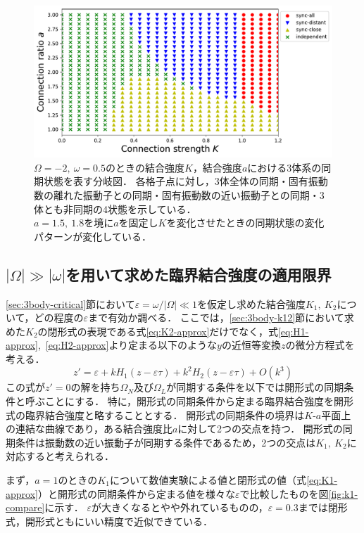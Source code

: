 \documentclass[../main]{subfiles}
\begin{document}
\begin{figure}[tbp]
\centering
\includegraphics[width=135mm]{./images/three-body-phase-boundary.pdf}
\centering
\caption{$\Omega=-2,\ \omega=0.5$のときの結合強度$K$，結合強度$a$における3体系の同期状態を表す分岐図．
各格子点に対し，3体全体の同期・固有振動数の離れた振動子との同期・固有振動数の近い振動子との同期・3体とも非同期の4状態を示している．\\
$a=1.5,\ 1.8$を境に$a$を固定し$K$を変化させたときの同期状態の変化パターンが変化している．}
\label{fig:3body-phase-boundary}
\end{figure}

\subsection{$|\Omega|\gg|\omega|$を用いて求めた臨界結合強度の適用限界}
\ref{sec:3body-critical}節において$\varepsilon=\omega/|\Omega|\ll 1$を仮定し求めた結合強度$K_1,\ K_2$について，どの程度の$\varepsilon$まで有効か調べる．
ここでは，\ref{sec:3body-k12}節において求めた$K_2$の閉形式の表現である式\eqref{eq:K2-approx}だけでなく，式\eqref{eq:H1-approx},\ \eqref{eq:H2-approx}より定まる以下のような$y$の近恒等変換$z$の微分方程式を考える．
\begin{equation}
    \label{eq:k1k2-open}
    z'=\varepsilon+kH_1(z-\varepsilon\tau)+k^2H_2(z-\varepsilon\tau)+O(k^3)
\end{equation}
この式が$z'=0$の解を持ち$\Omega_N$及び$\Omega_L$が同期する条件を以下では開形式の同期条件と呼ぶことにする．
特に，開形式の同期条件から定まる臨界結合強度を開形式の臨界結合強度と略することとする．
開形式の同期条件の境界は$K$-$a$平面上の連結な曲線であり，ある結合強度比$a$に対して2つの交点を持つ．
開形式の同期条件は振動数の近い振動子が同期する条件であるため，2つの交点は$K_1,\ K_2$に対応すると考えられる．

まず，$a=1$のときの$K_1$について数値実験による値と閉形式の値（式\eqref{eq:K1-approx}）と開形式の同期条件から定まる値を様々な$\varepsilon$で比較したものを図\ref{fig:k1-compare}に示す．
$\varepsilon$が大きくなるとやや外れているものの，$\varepsilon=0.3$までは閉形式，開形式ともにいい精度で近似できている．
\end{document}
